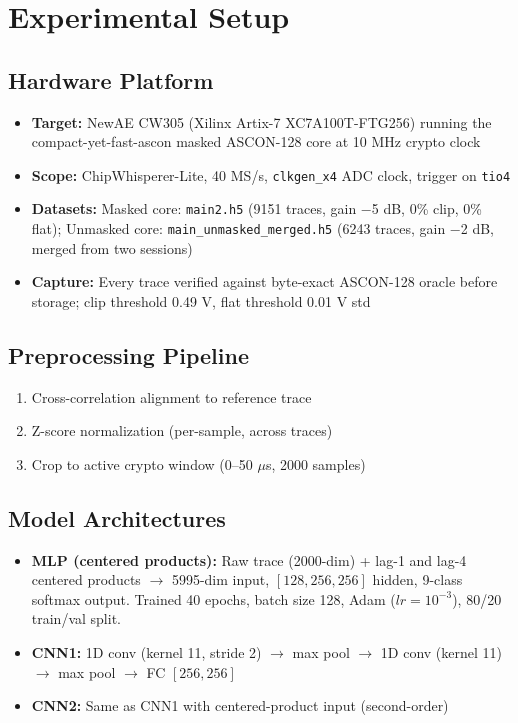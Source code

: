 \documentclass[a4paper,11pt,twocolumn]{article}
\begin{document}
\section{Experimental Setup}

\subsection{Hardware Platform}

\begin{itemize}[leftmargin=*,nosep]
\item \textbf{Target:} NewAE CW305 (Xilinx Artix-7 XC7A100T-FTG256) running the compact-yet-fast-ascon masked ASCON-128 core at 10 MHz crypto clock
\item \textbf{Scope:} ChipWhisperer-Lite, 40 MS/s, \texttt{clkgen\_x4} ADC clock, trigger on \texttt{tio4}
\item \textbf{Datasets:} Masked core: \texttt{main2.h5} (9151 traces, gain $-$5 dB, 0\% clip, 0\% flat); Unmasked core: \texttt{main\_unmasked\_merged.h5} (6243 traces, gain $-$2 dB, merged from two sessions)
\item \textbf{Capture:} Every trace verified against byte-exact ASCON-128 oracle before storage; clip threshold 0.49 V, flat threshold 0.01 V std
\end{itemize}

\subsection{Preprocessing Pipeline}

\begin{enumerate}[leftmargin=*,nosep]
\item Cross-correlation alignment to reference trace
\item Z-score normalization (per-sample, across traces)
\item Crop to active crypto window (0--50 $\mu$s, 2000 samples)
\end{enumerate}

\subsection{Model Architectures}

\begin{itemize}[leftmargin=*,nosep]
\item \textbf{MLP (centered products):} Raw trace (2000-dim) + lag-1 and lag-4 centered products $\rightarrow$ 5995-dim input, $[128, 256, 256]$ hidden, 9-class softmax output. Trained 40 epochs, batch size 128, Adam ($lr=10^{-3}$), 80/20 train/val split.
\item \textbf{CNN1:} 1D conv (kernel 11, stride 2) $\rightarrow$ max pool $\rightarrow$ 1D conv (kernel 11) $\rightarrow$ max pool $\rightarrow$ FC $[256, 256]$
\item \textbf{CNN2:} Same as CNN1 with centered-product input (second-order)
\end{itemize}
\end{document}
